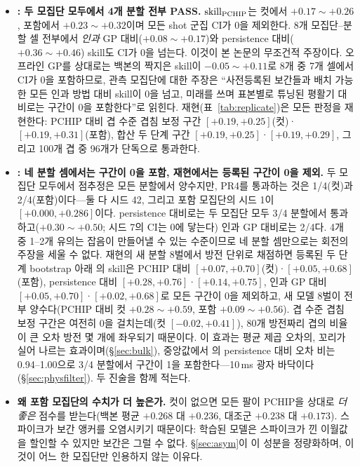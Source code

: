 \documentclass[10pt,a4paper]{article}
\begin{document}
\begin{itemize}
  \item \textbf{\Ti{}: 두 모집단 모두에서 4개 분할 전부 PASS.}
        $\mathrm{skill}_{\mathrm{PCHIP}}$는 컷에서 $+0.17\sim+0.26$, 포함에서 $+0.23\sim+0.32$이며 모든
        shot 군집 CI가 0을 제외한다. 8개 모집단--분할 셀 전부에서 \emph{인과}
        GP 대비($+0.08\sim+0.17$)와 persistence 대비($+0.36\sim+0.46$) skill도 CI가
        0을 넘는다. 이것이 본 논문의 무조건적 주장이다. 오프라인 GP를 상대로는
        백본의 짝지은 skill이 $-0.05\sim+0.11$로 8개 중 7개 셀에서 CI가 0을
        포함하므로, 관측 모집단에 대한 주장은 ``사전등록된 보간들과 배치 가능한
        모든 인과 방법 대비 skill이 0을 넘고, 미래를 쓰며 표본별로 튜닝된
        평활기 대비로는 구간이 0을 포함한다''로 읽힌다. 재현(표~\ref{tab:replicate})은 모든 판정을 재현한다: PCHIP 대비
        겹 수준 겹침 보정 구간 $[+0.19, +0.25]$(컷)·$[+0.19, +0.31]$(포함), 합산
        두 단계 구간 $[+0.19, +0.25]$·$[+0.19, +0.29]$, 그리고 100개 겹 중 96개가
        단독으로 통과한다.
  \item \textbf{\Vrot{}: 네 분할 셈에서는 구간이 0을 포함, 재현에서는 등록된
        구간이 0을 제외.} 두
        모집단 모두에서 점추정은 모든 분할에서 양수지만, PR4를 통과하는 것은
        1/4(컷)과 2/4(포함)이다---둘 다 시드 42, 그리고 포함 모집단의 시드 1이
        $[+0.000, +0.286]$이다. persistence 대비로는 두 모집단 모두 3/4 분할에서
        통과하고($+0.30\sim+0.50$; 시드 7의 CI는 0에 닿는다) 인과 GP 대비로는
        2/4다. 4개 중 1--2개 유의는 잡음이 만들어낼 수 있는 수준이므로 네 분할
        셈만으로는 회전의 주장을 세울 수 없다. 재현의 새 분할 8벌에서
        방전 단위로 채점하면 등록된 두 단계 bootstrap 아래 \Vrot{}의 skill은 PCHIP
        대비 $[+0.07, +0.70]$(컷)·$[+0.05, +0.68]$(포함), persistence 대비
        $[+0.28, +0.76]$·$[+0.14, +0.75]$, 인과 GP 대비 $[+0.05, +0.70]$·$[+0.02,
        +0.68]$로 모든 구간이 0을 제외하고, 새 모델 8벌이 전부 양수다(PCHIP 대비 컷 $+0.28\sim+0.59$, 포함
        $+0.09\sim+0.56$). 겹 수준 겹침 보정 구간은 여전히 0을 걸치는데(컷
        $[-0.02, +0.41]$), 80개 방전짜리 겹의 비율이 큰 오차 방전 몇 개에
        좌우되기 때문이다. 이 효과는 평균 제곱 오차의, 꼬리가 실어 나르는
        효과이며(\S\ref{sec:bulk}), 중앙값에서 \Vrot{}의 persistence 대비 오차 비는
        0.94--1.00으로 3/4 분할에서 구간이 1을 포함한다---10\,ms 광자
        바닥이다(\S\ref{sec:physfilter}). 두 진술을 함께 적는다.
  \item \textbf{왜 포함 모집단의 수치가 더 높은가.} 컷이 없으면 모든 팔이 PCHIP을
        상대로 \emph{더 좋은} 점수를 받는다(백본 평균 $+0.268$ 대 $+0.236$,
        대조군 $+0.238$ 대 $+0.173$). 스파이크가 보간 앵커를 오염시키기
        때문이다: 학습된 모델은 스파이크가 낀 이월값을 할인할 수 있지만 보간은
        그럴 수 없다. \S\ref{sec:asym}이 이 성분을 정량화하며, 이것이 어느 한
        모집단만 인용하지 않는 이유다.
\end{itemize}
\end{document}

